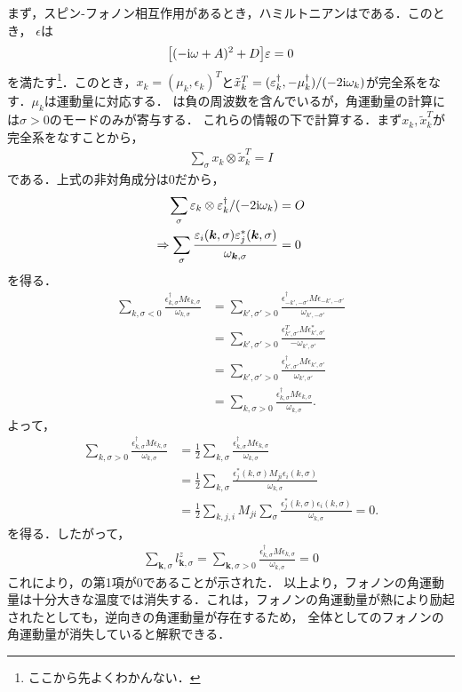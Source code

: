 \documentclass{report}
\begin{document}
まず，スピン-フォノン相互作用があるとき，ハミルトニアンはである．このとき，
$\epsilon$は
\begin{align}
  \qty[(-\mathrm{i}\omega + A)^2 + D]\varepsilon = 0 \label{eigen-spin}
\end{align}
を満たす\footnote{ここから先よくわかんない．}．このとき，$x_k = (\mu_k,\epsilon_k)^T$と$\tilde{x}_k^T = (\varepsilon_k^\dagger,-\mu_k^\dagger)/(-2\mathrm{i}\omega_k)$が完全系をなす．$\mu_k$は運動量に対応する．
は負の周波数を含んでいるが，角運動量の計算には$\sigma > 0$のモードのみが寄与する．
これらの情報の下で計算する．まず$x_k,\tilde{x}_k^T$が完全系をなすことから，
\begin{align}
  \sum_{\sigma} x_k \otimes \tilde{x}_k^T = I
\end{align}
である．上式の非対角成分は0だから，
\begin{align}
  \sum_{\sigma} \varepsilon_k \otimes \varepsilon_k^\dagger / (-2\mathrm{i}\omega_k) &= O\\
  \Rightarrow \sum_{\sigma} \frac{\varepsilon_i(\bm{k},\sigma) \varepsilon_j^{*}(\bm{k},\sigma)}{\omega_{\bm{k},\sigma}} &= 0
\end{align}
を得る．
\begin{align}
  \sum_{k, \sigma < 0} \frac{\epsilon_{k, \sigma}^\dagger M \epsilon_{k, \sigma}}{\omega_{k, \sigma}} 
  &= \sum_{k', \sigma' > 0} \frac{\epsilon_{-k', -\sigma'}^\dagger M \epsilon_{-k', -\sigma'}}{\omega_{k', -\sigma'}} \\
  &= \sum_{k', \sigma' > 0} \frac{\epsilon_{k', \sigma'}^T M \epsilon_{k', \sigma'}^*}{-\omega_{k', \sigma'}} \\
  &= \sum_{k', \sigma' > 0} \frac{\epsilon_{k', \sigma'}^\dagger M \epsilon_{k', \sigma'}}{\omega_{k', \sigma'}} \\
  &= \sum_{k, \sigma > 0} \frac{\epsilon_{k, \sigma}^\dagger M \epsilon_{k, \sigma}}{\omega_{k, \sigma}}.
\end{align}
よって，
\begin{align}
  \sum_{k, \sigma > 0} \frac{\epsilon_{k, \sigma}^\dagger M \epsilon_{k, \sigma}}{\omega_{k, \sigma}} 
  &= \frac{1}{2} \sum_{k, \sigma} \frac{\epsilon_{k, \sigma}^\dagger M \epsilon_{k, \sigma}}{\omega_{k, \sigma}} \\
  &= \frac{1}{2} \sum_{k, \sigma} \frac{\epsilon_j^*(k, \sigma) M_{ji} \epsilon_i(k, \sigma)}{\omega_{k, \sigma}} \\
  &= \frac{1}{2} \sum_{k, j, i} M_{ji} \sum_{\sigma} \frac{\epsilon_j^*(k, \sigma) \epsilon_i(k, \sigma)}{\omega_{k, \sigma}} = 0.
\end{align}
を得る．したがって，
\begin{align}
  \sum_{\bm{k},\sigma} l_{\bm{k},\sigma}^{z} = \sum_{\bm{k}, \sigma > 0} \frac{\epsilon_{k, \sigma}^\dagger M \epsilon_{k, \sigma}}{\omega_{k, \sigma}} = 0
\end{align}
これにより，の第1項が0であることが示された．
以上より，フォノンの角運動量は十分大きな温度では消失する．これは，フォノンの角運動量が熱により励起されたとしても，逆向きの角運動量が存在するため，
全体としてのフォノンの角運動量が消失していると解釈できる．
\end{document}

